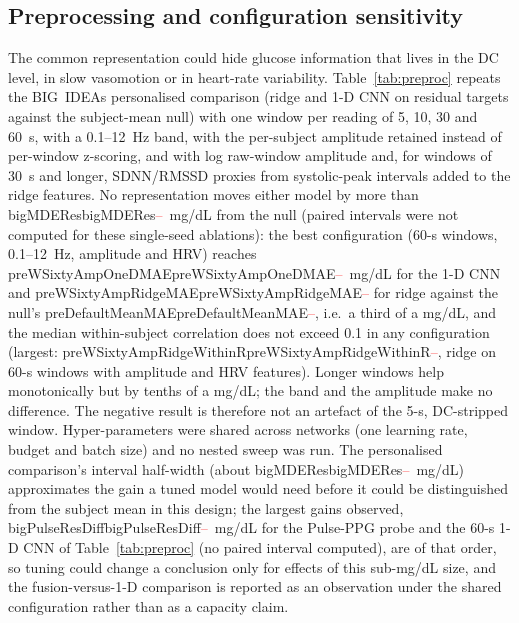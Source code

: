\documentclass[journal]{IEEEtran}
\newcommand{\m}[1]{\ifcsname #1\endcsname\csname #1\endcsname\else\textcolor{red}{--}\fi}
\begin{document}
\subsection{Preprocessing and configuration sensitivity}
\label{sec:preproc}
\label{sec:fairness}
The common representation could hide glucose information that lives in the
DC level, in slow vasomotion or in heart-rate variability.
Table~\ref{tab:preproc} repeats the BIG~IDEAs personalised comparison (ridge
and 1-D CNN on residual targets against the subject-mean null) with one
window per reading of 5, 10, 30 and 60~s, with a 0.1--12~Hz band, with the
per-subject amplitude retained instead of per-window z-scoring, and with
log raw-window amplitude and, for windows of 30~s and longer, SDNN/RMSSD
proxies from systolic-peak intervals added to the ridge features.  No
representation moves either model by more than \m{bigMDERes}~mg/dL from the
null (paired intervals were not computed for these single-seed ablations):
the best configuration (60-s windows, 0.1--12~Hz, amplitude and HRV)
reaches \m{preWSixtyAmpOneDMAE}~mg/dL for the 1-D CNN and
\m{preWSixtyAmpRidgeMAE} for ridge against the null's
\m{preDefaultMeanMAE}, i.e.\ a third of a mg/dL, and the median
within-subject correlation does not exceed 0.1 in any configuration
(largest: \m{preWSixtyAmpRidgeWithinR}, ridge on 60-s windows with
amplitude and HRV features).  Longer windows help monotonically but by
tenths of a mg/dL; the band and the amplitude make no difference.  The
negative result is therefore not an artefact of the 5-s, DC-stripped
window.  Hyper-parameters were shared across networks (one learning rate,
budget and batch size) and no nested sweep was run.  The personalised
comparison's interval half-width (about \m{bigMDERes}~mg/dL) approximates
the gain a tuned model would need before it could be distinguished from
the subject mean in this design; the largest gains observed,
\m{bigPulseResDiff}~mg/dL for the Pulse-PPG probe and the 60-s 1-D CNN of
Table~\ref{tab:preproc} (no paired interval computed), are of that order,
so tuning could change a conclusion only for effects of this sub-mg/dL
size, and the fusion-versus-1-D comparison is reported as an observation
under the shared configuration rather than as a capacity claim.
\end{document}
